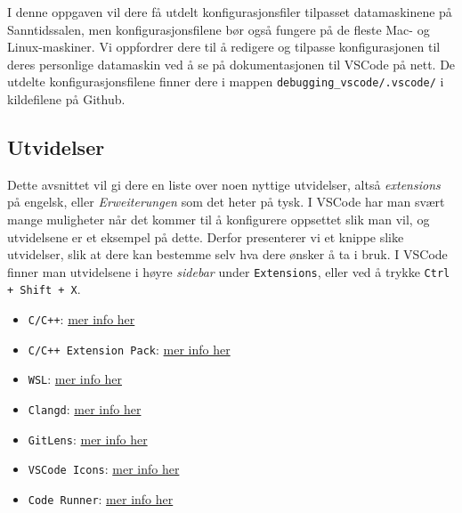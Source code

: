 I denne oppgaven vil dere få utdelt konfigurasjonsfiler tilpasset datamaskinene på Sanntidssalen, men konfigurasjonsfilene bør også fungere på de fleste Mac- og Linux-maskiner. Vi oppfordrer dere til å redigere og tilpasse konfigurasjonen til deres personlige datamaskin ved å se på dokumentasjonen til VSCode på nett. De utdelte konfigurasjonsfilene finner dere i mappen \verb|debugging_vscode/.vscode/| i kildefilene på Github.

\subsection{Utvidelser}
Dette avsnittet vil gi dere en liste over noen nyttige utvidelser, altså \textit{extensions} på engelsk, eller \textit{Erweiterungen} som det heter på tysk. I VSCode har man svært mange muligheter når det kommer til å konfigurere oppsettet slik man vil, og utvidelsene er et eksempel på dette. Derfor presenterer vi et knippe slike utvidelser, slik at dere kan bestemme selv hva dere ønsker å ta i bruk. I VSCode finner man utvidelsene i høyre \textit{sidebar} under \verb|Extensions|, eller ved å trykke \verb|Ctrl + Shift + X|.

\begin{itemize}
    \item \verb|C/C++|: \href{https://marketplace.visualstudio.com/items?itemName=ms-vscode.cpptools}{mer info her}
    \item \verb|C/C++ Extension Pack|: \href{https://marketplace.visualstudio.com/items?itemName=ms-vscode.cpptools-extension-pack}{mer info her}
    \item \verb|WSL|: \href{https://marketplace.visualstudio.com/items?itemName=ms-vscode-remote.remote-wsl}{mer info her}
    \item \verb|Clangd|: \href{https://marketplace.visualstudio.com/items?itemName=llvm-vs-code-extensions.vscode-clangd}{mer info her}
    \item \verb|GitLens|: \href{https://marketplace.visualstudio.com/items?itemName=eamodio.gitlens}{mer info her}
    \item \verb|VSCode Icons|: \href{https://marketplace.visualstudio.com/items?itemName=vscode-icons-team.vscode-icons}{mer info her}
    \item \verb|Code Runner|: \href{https://marketplace.visualstudio.com/items?itemName=formulahendry.code-runner}{mer info her}
    
\end{itemize}

